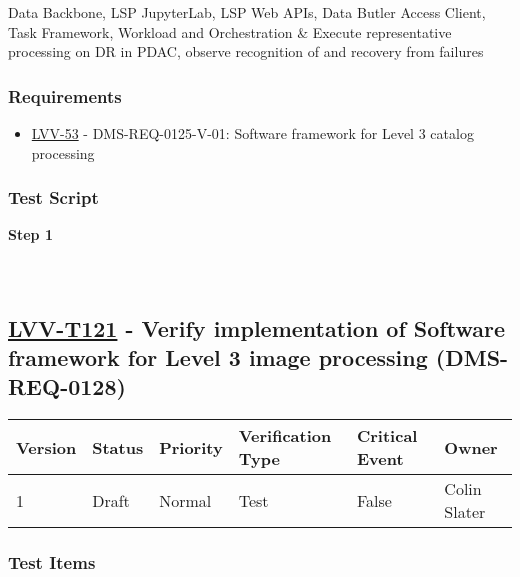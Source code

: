 Data Backbone, LSP JupyterLab, LSP Web APIs, Data Butler Access Client,
Task Framework, Workload and Orchestration \& Execute representative
processing on DR in PDAC, observe recognition of and recovery from
failures

\hypertarget{requirements-97}{%
\subsubsection{Requirements}\label{requirements-97}}

\begin{itemize}
\tightlist
\item
  \href{https://jira.lsstcorp.org/browse/LVV-53}{LVV-53} -
  DMS-REQ-0125-V-01: Software framework for Level 3 catalog processing
\end{itemize}

\hypertarget{test-script-97}{%
\subsubsection{Test Script}\label{test-script-97}}

\textbf{Step 1}\\
~\\
~\\

\hypertarget{lvv-t121---verify-implementation-of-software-framework-for-level-3-image-processing-dms-req-0128}{%
\subsection{\texorpdfstring{\href{https://jira.lsstcorp.org/secure/Tests.jspa\#/testCase/LVV-T121}{LVV-T121}
- Verify implementation of Software framework for Level 3 image
processing
(DMS-REQ-0128)}{LVV-T121 - Verify implementation of Software framework for Level 3 image processing (DMS-REQ-0128)}}\label{lvv-t121---verify-implementation-of-software-framework-for-level-3-image-processing-dms-req-0128}}

\begin{longtable}[]{@{}llllll@{}}
\toprule
Version & Status & Priority & Verification Type & Critical Event &
Owner\tabularnewline
\midrule
\endhead
1 & Draft & Normal & Test & False & Colin Slater\tabularnewline
\bottomrule
\end{longtable}

\hypertarget{test-items-97}{%
\subsubsection{Test Items}\label{test-items-97}}

